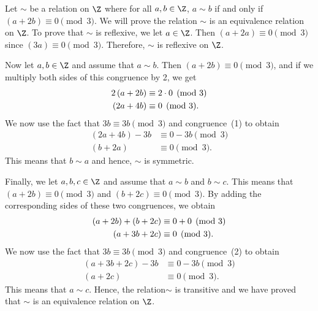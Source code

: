 \begin{enumerate}
\begin{enumerate}
\setcounter{equation}{0}
\begin{myproof}
Let $\sim$ be a relation on $\Z$ where for all $a, b \in \Z$,  
$a \sim b$ if and only if $\left( a + 2b \right) \equiv 0 \pmod 3$.  We will prove the relation 
$\sim$ is an equivalence relation on $\Z$.  To prove that $\sim$ is reflexive, we let $a \in \Z$.
Then $\left( a + 2a \right) \equiv 0 \pmod 3$ since 
$\left( 3a \right) \equiv 0 \pmod 3$. Therefore, $\sim$ is reflexive on $\Z$.  

Now let $a, b \in \Z$ and assume that $a \sim b$.  Then 
$\left( a + 2b \right) \equiv 0 \pmod 3$, and if we multiply both sides of this congruence by 2, we get
\begin{align}
2\left( a + 2b \right) &\equiv 2 \cdot 0 \pmod 3 \notag \\
\left( 2a + 4b \right) &\equiv 0 \pmod 3.
\end{align}
We now use the fact that $3b \equiv 3b \pmod 3$ and congruence~(1) to obtain
\begin{align*}
\left( 2a + 4b \right) - 3b  &\equiv 0 - 3b \pmod 3  \\
\left( b + 2a \right) &\equiv 0 \pmod 3. 
\end{align*}
This means that $b \sim a$ and hence, $\sim$ is symmetric.

Finally, we let $a, b, c \in \Z$ and assume that $a \sim b$ and $b \sim c$.  This means that 
$\left( a + 2b \right) \equiv 0\pmod 3$ and 
$\left( b + 2c \right) \equiv 0\pmod 3$.  By adding the corresponding sides of these two congruences, we obtain
\begin{align}
\left( a + 2b \right) + \left( b + 2c \right) &\equiv 0 + 0 \pmod 3 \notag \\
\left( a + 3b + 2c \right) &\equiv 0 \pmod 3.
\end{align}
We now use the fact that $3b \equiv 3b \pmod 3$ and congruence~(2) to obtain
\begin{align*}
\left( a + 3b + 2c \right) - 3b  &\equiv 0 - 3b \pmod 3 \\
\left( a + 2c \right) &\equiv 0 \pmod 3.
\end{align*}
This means that $a \sim c$.  Hence, the relation$\sim$ is transitive and we have proved that 
$\sim$ is an equivalence relation on $\Z$.
\end{myproof}
\end{enumerate}
\end{enumerate}
\hbreak
\endinput
















